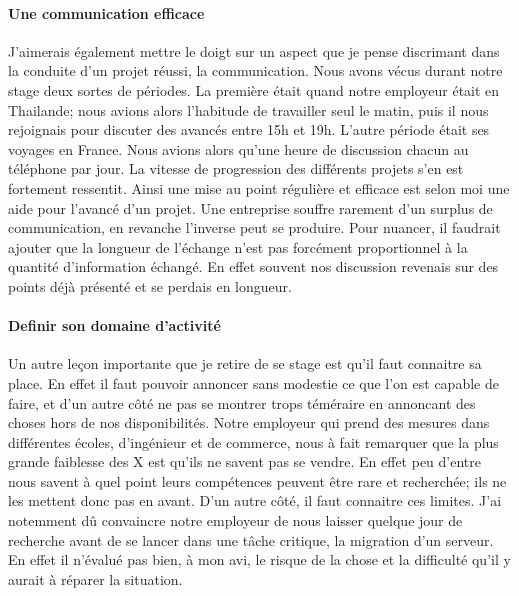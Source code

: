 \paragraph{Une communication efficace}
J'aimerais également mettre le doigt sur un aspect que je pense discrimant dans la conduite d'un projet réussi, la communication. Nous avons vécus durant notre stage deux sortes de périodes. La première était quand notre employeur était en Thailande; nous avions alors l'habitude de travailler seul le matin, puis il nous rejoignais pour discuter des avancés entre 15h et 19h. L'autre période était ses voyages en France. Nous avions alors qu'une heure de discussion chacun au téléphone par jour. La vitesse de progression des différents projets s'en est fortement ressentit. Ainsi une mise au point régulière et efficace est selon moi une aide pour l'avancé d'un projet. Une entreprise souffre rarement d'un surplus de communication, en revanche l'inverse peut se produire. Pour nuancer, il faudrait ajouter que la longueur de l'échange n'est pas forcément proportionnel à la quantité d'information échangé. En effet souvent nos discussion revenais sur des points déjà présenté et se perdais en longueur.

\paragraph{Definir son domaine d'activité}
Un autre leçon importante que je retire de se stage est qu'il faut connaitre sa place. En effet il faut pouvoir annoncer sans modestie ce que l'on est capable de faire, et d'un autre côté ne pas se montrer trops téméraire en annoncant des choses hors de nos disponibilités. Notre employeur qui prend des mesures dans différentes écoles, d'ingénieur et de commerce, nous à fait remarquer que la plus grande faiblesse des X est qu'ils ne savent pas se vendre. En effet peu d'entre nous savent à quel point leurs compétences peuvent être rare et recherchée; ils ne les mettent donc pas en avant. D'un autre côté, il faut connaitre ces limites. J'ai notemment dû convaincre notre employeur de nous laisser quelque jour de recherche avant de se lancer dans une tâche critique, la migration d'un serveur. En effet il n'évalué pas bien, à mon avi, le risque de la chose et la difficulté qu'il y aurait à réparer la situation.

